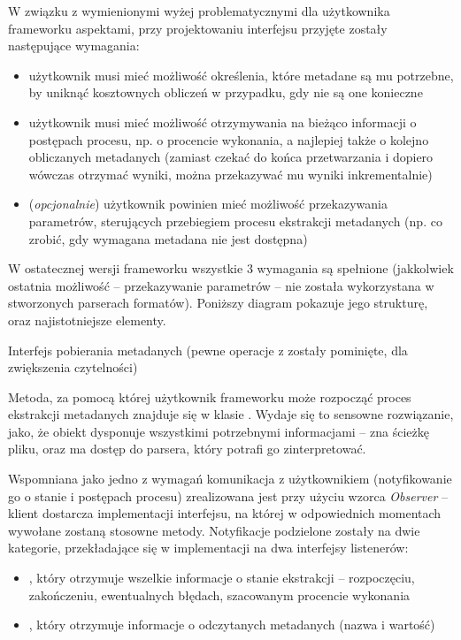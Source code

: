 W związku z wymienionymi wyżej problematycznymi dla użytkownika frameworku aspektami, przy
projektowaniu interfejsu przyjęte zostały następujące wymagania:

\begin{itemize}

  \item użytkownik musi mieć możliwość określenia, które metadane są mu potrzebne, by uniknąć
    kosztownych obliczeń w przypadku, gdy nie są one konieczne

  \item użytkownik musi mieć możliwość otrzymywania na bieżąco informacji o postępach procesu, np. o
    procencie wykonania, a najlepiej także o kolejno obliczanych metadanych (zamiast czekać do końca
    przetwarzania i dopiero wówczas otrzymać wyniki, można przekazywać mu wyniki inkrementalnie)

  \item (\emph{opcjonalnie}) użytkownik powinien mieć możliwość przekazywania parametrów,
    sterujących przebiegiem procesu ekstrakcji metadanych (np. co zrobić, gdy wymagana metadana nie
    jest dostępna)

\end{itemize}

W ostatecznej wersji frameworku wszystkie 3 wymagania są spełnione (jakkolwiek ostatnia możliwość --
przekazywanie parametrów -- nie została wykorzystana w stworzonych parserach formatów). Poniższy
diagram pokazuje jego strukturę, oraz najistotniejsze elementy.

{Interfejs pobierania metadanych (pewne operacje z  zostały pominięte, dla
zwiększenia czytelności)}


Metoda, za pomocą której użytkownik frameworku może rozpocząć proces ekstrakcji metadanych znajduje
się w klasie . Wydaje się to sensowne rozwiązanie, jako, że obiekt 
dysponuje wszystkimi potrzebnymi informacjami -- zna ścieżkę pliku, oraz ma dostęp do parsera, który
potrafi go zinterpretować.

Wspomniana jako jedno z wymagań komunikacja z użytkownikiem (notyfikowanie go o stanie i postępach
procesu) zrealizowana jest przy użyciu wzorca \emph{Observer} -- klient dostarcza implementacji
interfejsu, na której w odpowiednich momentach wywołane zostaną stosowne metody. Notyfikacje
podzielone zostały na dwie kategorie, przekładające się w implementacji na dwa interfejsy
listenerów:

\begin{itemize}

  \item {}, który otrzymuje wszelkie informacje o stanie ekstrakcji --
    rozpoczęciu, zakończeniu, ewentualnych błędach, szacowanym procencie wykonania

  \item {}, który otrzymuje informacje o odczytanych metadanych (nazwa i
    wartość)

\end{itemize}

